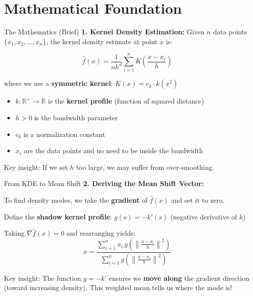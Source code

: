 \section{Mathematical Foundation}

\begin{frame}{The Mathematics (Brief)}
    \textbf{1. Kernel Density Estimation:}
    Given $n$ data points $\{x_1, x_2, \ldots, x_n\}$, the kernel density estimate at point $x$ is:

    \[
    \hat{f}(x) = \frac{1}{n h^d} \sum_{i=1}^{n} K\left(\frac{x - x_i}{h}\right)
    \]

    where we use a \textbf{symmetric kernel}: $K(x) = c_k \cdot k(x^2)$
    \begin{itemize}
        \item $k: \mathbb{R}^+ \to \mathbb{R}$ is the \textbf{kernel profile} (function of squared distance)
        \item $h > 0$ is the bandwidth parameter
        \item $c_k$ is a normalization constant
        \item $x_i$ are the data points and no need to be inside the bandwidth
    \end{itemize}

    \small{\textcolor{customred}{Key insight:} If we set $h$ too large, we may suffer from over-smoothing.}
\end{frame}

\begin{frame}{From KDE to Mean Shift}
    \textbf{2. Deriving the Mean Shift Vector:}

    To find density modes, we take the \textbf{gradient} of $\hat{f}(x)$ and set it to zero.

    \vspace{0.2cm}
    Define the \textbf{shadow kernel profile}: $g(s) = -k'(s)$ (negative derivative of $k$)

    \vspace{0.2cm}
    Taking $\nabla \hat{f}(x) = 0$ and rearranging yields:
    \[
    x = \frac{\sum_{i=1}^{n} x_i \, g\left(\left\|\frac{x - x_i}{h}\right\|^2\right)}{\sum_{i=1}^{n} g\left(\left\|\frac{x - x_i}{h}\right\|^2\right)}
    \]

    \small{\textcolor{customred}{Key insight:} The function $g = -k'$ ensures we \textbf{move along} the gradient direction (toward increasing density). This weighted mean tells us where the mode is!}
\end{frame}

